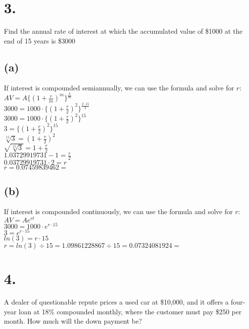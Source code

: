 \documentclass{article}
\begin{document}
\section*{3.}
{\Large 

Find the annual rate of interest at which the accumulated value of \$1000 at the end of 15 years is \$3000

\subsection*{(a)}

If interest is compounded semiannually, we can use the formula and solve for $r$: \\
$AV = A\{(1 + \frac{r}{m})^m\}^{\frac{k}{m}}$ \\
$3000 = 1000 \cdot \{(1 + \frac{r}{2})^2\}^{\frac{2 \cdot 15}{2}}$ \\
$3000 = 1000 \cdot \{(1 + \frac{r}{2})^2\}^{15}$ \\
$3 = \{(1 + \frac{r}{2})^2\}^{15}$ \\
$\sqrt[15]{3} = (1 + \frac{r}{2})^2$ \\
$\sqrt{\sqrt[15]{3}} = 1 + \frac{r}{2}$ \\
$1.03729919731 - 1 = \frac{r}{2}$ \\
$0.03729919731 \cdot 2 = r$ \\
$r = 0.07459839462 = $ 

\subsection*{(b)}

If interest is compounded continuously, we can use the formula and solve for $r$: \\
$AV = Ae^{rt}$ \\
$3000 = 1000 \cdot e^{r \cdot 15}$ \\
$3 = e^{r \cdot 15}$ \\
$ln(3) = r \cdot 15$ \\
$r = ln(3) \div 15 = 1.09861228867 \div 15 = 0.07324081924 = $ 

}

\section*{4.}
{\Large 

A dealer of questionable repute prices a used car at \$10,000, and it offers a four-year loan at 18\% compounded monthly, where the customer must pay \$250 per month. How much will the down payment be? \\



}
\end{document}
